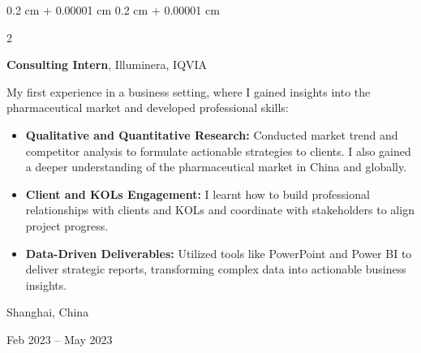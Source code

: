 \documentclass[10pt, letterpaper]{article}
\newenvironment{highlights}{
    \begin{itemize}[
        topsep=0.10 cm,
        parsep=0.10 cm,
        partopsep=0pt,
        itemsep=0pt,
        leftmargin=0.4 cm + 10pt
    ]
}{
    \end{itemize}
} %
\newenvironment{onecolentry}{
    \begin{adjustwidth}{
        0.2 cm + 0.00001 cm
    }{
        0.2 cm + 0.00001 cm
    }
}{
    \end{adjustwidth}
} %
\newenvironment{twocolentry}[2][]{
    \onecolentry
    \def\secondColumn{#2}
    \setcolumnwidth{\fill, 4.5 cm}
    \begin{paracol}{2}
}{
    \switchcolumn \raggedleft \secondColumn
    \end{paracol}
    \endonecolentry
} %
\begin{document}
        \vspace{0.3 cm}

        \begin{twocolentry}{
    Shanghai, China

    Feb 2023 – May 2023
}
    \textbf{Consulting Intern}, Illuminera, IQVIA

    \vspace{0.1cm}
    
    My first experience in a business setting, where I gained insights into the pharmaceutical market and developed professional skills:
    

    \begin{highlights}
        \item \textbf{Qualitative and Quantitative Research:} Conducted market trend and competitor analysis to formulate actionable strategies to clients. I also gained a deeper understanding of the pharmaceutical market in China and globally.

        \vspace{0.1cm}
        
        \item \textbf{Client and KOLs Engagement:} I learnt how to build professional relationships with clients and KOLs and coordinate with stakeholders to align project progress.

        \vspace{0.1cm}
        
        \item \textbf{Data-Driven Deliverables:} Utilized tools like PowerPoint and Power BI to deliver strategic reports, transforming complex data into actionable business insights.
    \end{highlights}
\end{twocolentry}

        \vspace{0.3 cm}


    

        
\end{document}
